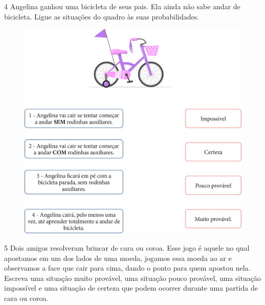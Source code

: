
\pagebreak
\num{4} Angelina ganhou uma bicicleta de seus pais. Ela ainda não sabe andar de
bicicleta. Ligue as situações do quadro às suas probabilidades.


\begin{figure}[htpb!]
\includegraphics[width=\textwidth]{./media/image87.png}
\end{figure}


\num{5} Dois amigos resolveram brincar de cara ou coroa. Esse jogo é aquele no
qual apostamos em um dos lados de uma moeda, jogamos essa moeda ao ar e observamos a face
que cair para cima, dando o ponto para quem apostou nela. Escreva uma
situação muito provável, uma situação pouco provável, uma situação
impossível e uma situação de certeza que podem ocorrer durante uma partida de cara ou coroa.

